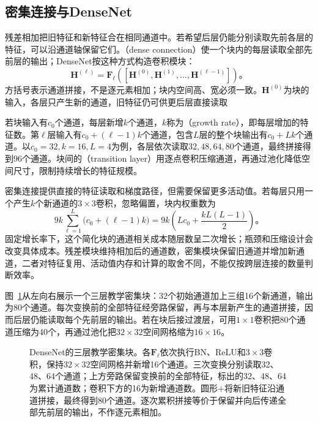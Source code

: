 \FloatBarrier

\subsection{密集连接与DenseNet}
\label{sec:cnn-densenet}

残差相加把旧特征和新特征合在相同通道中。若希望后层仍能分别读取先前各层的特征，可以沿通道轴保留它们。（dense connection）使一个块内的每层读取全部先前层的输出；DenseNet按这种方式构造卷积模块：
\begin{equation}
  \bm H^{(\ell)}=\bm F_\ell\!\left(
      [\bm H^{(0)},\bm H^{(1)},\ldots,\bm H^{(\ell-1)}]
    \right)\text{。}
  \label{eq:cnn-dense-block}
\end{equation}
方括号表示通道拼接，不是逐元素相加；块内空间高、宽必须一致。$\bm H^{(0)}$为块的输入，各层只产生新的通道，旧特征仍可供更后层直接读取

若块输入有$c_0$个通道，每层新增$k$个通道，$k$称为（growth rate），即每层增加的特征数。第$\ell$层输入有$c_0+(\ell-1)k$个通道，包含$L$层的整个块输出有$c_0+Lk$个通道。以$c_0=32,k=16,L=4$为例，各层依次读取$32,48,64,80$个通道，最终拼接得到$96$个通道。块间的（transition layer）用逐点卷积压缩通道，再通过池化降低空间尺寸，限制持续增长的特征规模。

密集连接提供直接的特征读取和梯度路径，但需要保留更多活动值。若每层只用一个产生$k$个新通道的$3\times3$卷积，忽略偏置，块内权重数为
\begin{equation}
  9k\sum_{\ell=1}^{L}\bigl(c_0+(\ell-1)k\bigr)
  =9k\left(Lc_0+\frac{kL(L-1)}2\right)\text{。}
  \label{eq:cnn-dense-cost}
\end{equation}
固定增长率下，这个简化块的通道相关成本随层数呈二次增长；瓶颈和压缩设计会改变具体成本。残差模块维持相加后的通道数，密集模块保留旧通道并增加新通道，二者对特征复用、活动值内存和计算的取舍不同，不能仅按跨层连接的数量判断效率。


图~\ref{fig:cnn-densenet}从左向右展示一个三层教学密集块：32个初始通道加上三组16个新通道，输出为80个通道。每次变换前的全部特征经旁路保留，再与本层新产生的通道拼接，因而后层仍能读取每个先前层的输出。若在块后接过渡层，可用$1\times1$卷积把80个通道压缩为40个，再通过池化把$32\times32$空间网格缩为$16\times16$。

\begin{figure}[tbp]
  \centering
  
  \caption{DenseNet的三层教学密集块。各$\bm F_\ell$依次执行BN、ReLU和$3\times3$卷积，保持$32\times32$空间网格并新增16个通道。三次变换分别读取32、48、64个通道；上方旁路保留变换前的全部特征，标出的32、48、64为累计通道数；卷积下方的16为新增通道数。圆形$+$将新旧特征沿通道拼接，最终得到80个通道。逐次累积拼接等价于保留并向后传递全部先前层的输出，不作逐元素相加。}
  \label{fig:cnn-densenet}
\end{figure}

